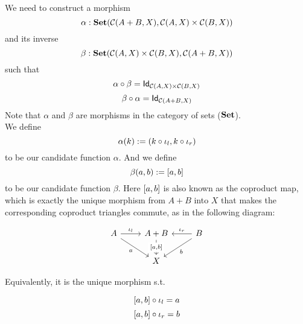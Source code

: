 \begin{solution}\label{sol:coproduct-represent}
\newcommand{\CP}{\CC(A+B,X)}
\newcommand{\CQ}{\CC(A,X)\times\CC(B,X)}
\newcommand{\PP}{\CC(X,A\times B)}
\newcommand{\PQ}{\CC(X,A)\times\CC(X,B)}
 We need to construct a morphism \[\alpha:\SET(\CP, \CQ)\] and its inverse \[\beta:\SET(\CQ, \CP)\]
such that
\begin{equation}
\label{coproduct-iso-1}
    \alpha \circ \beta = \Id[\CQ]
\end{equation}
\begin{equation}
\label{coproduct-iso-2}
    \beta \circ \alpha = \Id[\CP]
\end{equation}
%
Note that $\alpha$ and $\beta$ are morphisms in the category of sets ($\mathbf{Set}$).\\

We define \[\alpha(k):=(k \circ \iota_l, k \circ \iota_r)\] to be our candidate function $\alpha$. And we define \[\beta(a,b):= [ a, b ]\] to be our candidate function $\beta$. Here $[ a, b ]$ is also known as the coproduct map, which is exactly the unique morphism from $A+B$ into $X$ that makes the corresponding coproduct triangles commute, as in the following diagram:

\[
\begin{tikzcd}
A \arrow[r, "\inl"] \arrow[rd, "a"'] & A+B \arrow[d, "{\outofcoproduct{a}{b}}" description] & B \arrow[l, "\inr"'] \arrow[ld, "b"] \\
                                    & X                                    &
\end{tikzcd}
\]

Equivalently, it is the unique morphism s.t.

\begin{equation}
\label{coproduct-iso-inl}
    [ a, b ] \circ \iota_l = a
\end{equation}
\begin{equation}
\label{coproduct-iso-inr}
    [ a, b ] \circ \iota_r = b
\end{equation}


\end{solution}
